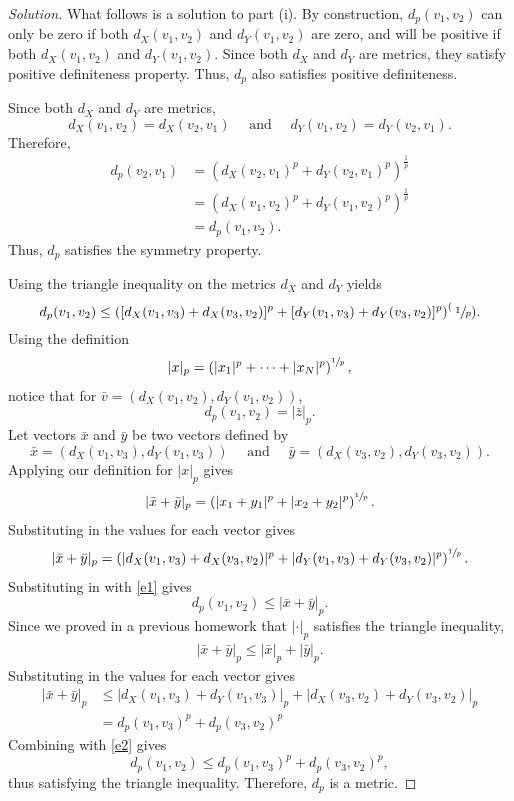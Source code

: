 \documentclass[11pt,letterpaper]{article}
\newenvironment{solution}
  {\renewcommand\qedsymbol{}\begin{proof}[Solution]}
  {\end{proof}\bigskip}
\begin{document}
\begin{solution}
	What follows is a solution to part (i). By construction, $d_p(v_1,v_2)$ can only be zero if both $d_X(v_1,v_2)$ and $d_Y(v_1,v_2)$ are zero, and will be positive if both $d_X(v_1,v_2)$ and $d_Y(v_1,v_2)$. Since both $d_X$ and $d_Y$ are metrics, they satisfy positive definiteness property. Thus, $d_p$ also satisfies positive definiteness.
	
	Since both $d_X$ and $d_Y$ are metrics, $$d_X(v_1,v_2) = d_X(v_2,v_1) \quad \text{ and } \quad d_Y(v_1,v_2) = d_Y(v_2,v_1).$$ Therefore, 
	\[\begin{split}
		d_p(v_2,v_1) &= \left( d_X(v_2,v_1)^p + d_Y(v_2,v_1)^p\right)^\frac{1}{p}\\
		&= \left( d_X(v_1,v_2)^p + d_Y(v_1,v_2)^p\right)^\frac{1}{p}\\
		&= d_p(v_1,v_2).
	\end{split}\]
	Thus, $d_p$ satisfies the symmetry property.
	
	
	Using the triangle inequality on the metrics $d_X$ and $d_Y$ yields 
	\begin{equation}\label{e1}
	d_p(v_1,v_2) \leq \left ( [d_X(v_1,v_3) + d_X(v_3,v_2)]^p + [d_Y(v_1,v_3) + d_Y(v_3,v_2)]^p \right )^(\sfrac{1}{p}).
	\end{equation}
	Using the definition 
	\[\begin{split}
		|x|_p = \left(|x_1|^p + \cdots + |x_N|^p\right)^{\sfrac{1}{p}},
	\end{split}\] notice that for $\bar v = (d_X(v_1, v_2), d_Y(v_1,v_2))$, $$d_p(v_1,v_2) = |\bar z|_p.$$
	Let vectors $\bar x$ and $\bar y$ be two vectors defined by $$\bar x = (d_X(v_1,v_3), d_Y(v_1,v_3)) \quad \text{ and } \quad \bar y = (d_X(v_3,v_2), d_Y(v_3,v_2)).$$ Applying our definition for $|x|_p$ gives
	\[\begin{split}
		|\bar x +\bar y|_p = \left(|x_1 + y_1|^p + |x_2+y_2|^p\right)^{\sfrac{1}{p}}.
	\end{split}\]
	Substituting in the values for each vector gives
	\[\begin{split}
		|\bar x +\bar y|_p = \left(|d_X(v_1,v_3) + d_X(v_3,v_2)|^p + |d_Y(v_1,v_3)+d_Y(v_3,v_2)|^p\right)^{\sfrac{1}{p}}.
	\end{split}\]
	Substituting in with \eqref{e1} gives 
	\begin{equation}\label{e2}
	d_p(v_1, v_2) \leq |\bar x +\bar y|_p.
	\end{equation}
	Since we proved in a previous homework that $|\cdot|_p$ satisfies the triangle inequality,
	\[\begin{split}
		|\bar x +\bar y|_p \leq |\bar x|_p + |\bar y|_p.
	\end{split}\]
	Substituting in the values for each vector gives 
	\[\begin{split}
		|\bar x +\bar y|_p &\leq |d_X(v_1,v_3) + d_Y(v_1,v_3)|_p + |d_X(v_3,v_2)+ d_Y(v_3,v_2)|_p\\
		& = d_p(v_1,v_3)^p + d_p(v_3,v_2)^p
	\end{split}\]
	Combining with \eqref{e2} gives $$d_p(v_1, v_2) \leq d_p(v_1,v_3)^p + d_p(v_3,v_2)^p,$$ thus satisfying the triangle inequality. Therefore, $d_p$ is a metric.
	

\end{solution}
\end{document}
